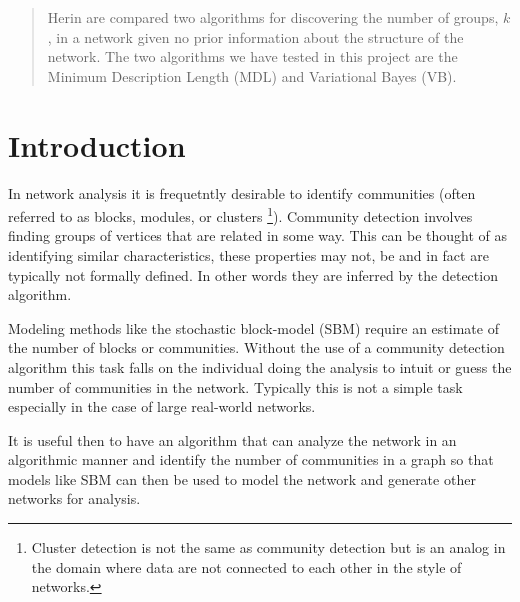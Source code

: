 \documentclass[twocolumn,twoside]{IEEEtran}
\author{Brett Israelsen \& Joshua Rahm}
\begin{document}
\maketitle

\begin{abstract}
Herin are compared two algorithms for discovering
the number of groups, $k$, in a network given no prior information about the
structure of the network. The two algorithms we have tested in this project are
the Minimum Description Length (MDL)\cite{Peixoto2013} and Variational Bayes (VB)\cite{Hofman2008}.
\end{abstract}

\section*{Introduction}\label{sec:Intro} In network analysis it is frequetntly
desirable to identify communities (often referred to as blocks, modules, or
clusters \footnote{Cluster detection is not the same as community detection but
is an analog in the domain where data are not connected to each other in the style
of networks.}). Community detection involves finding groups of vertices that
are related in some way. This can be thought of as identifying similar characteristics,
these properties may not, be and in fact are typically not formally defined. In
other words they are inferred by the detection algorithm.

Modeling methods like the stochastic block-model (SBM) require an estimate of 
the number of blocks or communities. Without the use of a community detection
algorithm this task falls on the individual doing the analysis to intuit or
guess the number of communities in the network. Typically this is not a simple
task especially in the case of large real-world networks.


It is useful then to have an algorithm that can analyze the network in an
algorithmic manner and identify the number of communities in a graph so that
models like SBM can then be used to model the network and generate other
networks for analysis.

% 
% 
% 
\end{document}
